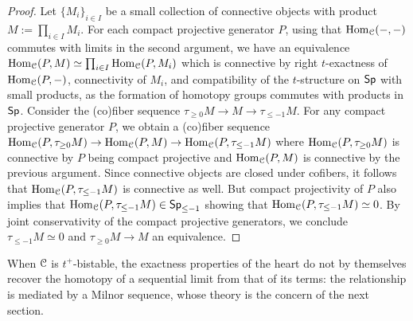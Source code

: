 \begin{proof}
    Let $\{M_{i}\}_{i\in I}$ be a small collection of connective objects with product $M:=\prod_{i\in I}M_{i}$. For each compact projective generator $P$, using that $\mathrm{Hom}_{\EuScript{C}}(-,-)$ commutes with limits in the second argument, we have an equivalence $\mathrm{Hom}_{\EuScript{C}}(P,M)\simeq\prod_{i\in I}\mathrm{Hom}_{\EuScript{C}}(P,M_{i})$ which is connective by right $t$-exactness of $\mathrm{Hom}_{\EuScript{C}}(P,-)$, connectivity of $M_{i}$, and compatibility of the $t$-structure on $\mathsf{Sp}$ with small products, as the formation of homotopy groups commutes with products in $\mathsf{Sp}$. Consider the (co)fiber sequence $\tau_{\geq 0}M\to M\to\tau_{\leq -1}M$. For any compact projective generator $P$, we obtain a (co)fiber sequence $\mathrm{Hom}_{\EuScript{C}}(P,\tau_{\geq0}M)\to \mathrm{Hom}_{\EuScript{C}}(P,M)\to\mathrm{Hom}_{\EuScript{C}}(P, \tau_{\leq -1}M)$ where $\mathrm{Hom}_{\EuScript{C}}(P,\tau_{\geq0}M)$ is connective by $P$ being compact projective and $\mathrm{Hom}_{\EuScript{C}}(P,M)$ is connective by the previous argument. Since connective objects are closed under cofibers, it follows that $\mathrm{Hom}_{\EuScript{C}}(P, \tau_{\leq -1}M)$ is connective as well. But compact projectivity of $P$ also implies that $\mathrm{Hom}_{\EuScript{C}}(P, \tau_{\leq -1}M)\in\mathsf{Sp}_{\leq-1}$ showing that $\mathrm{Hom}_{\EuScript{C}}(P, \tau_{\leq -1}M)\simeq0$. By joint conservativity of the compact projective generators, we conclude $\tau_{\leq-1}M\simeq0$ and $\tau_{\geq0}M\to M$ an equivalence. 
\end{proof}
When $\EuScript{C}$ is $t^{+}$-bistable, the exactness properties of the heart do not by themselves recover the homotopy of a sequential limit from that of its terms: the relationship is mediated by a Milnor sequence, whose theory is the concern of the next section.
